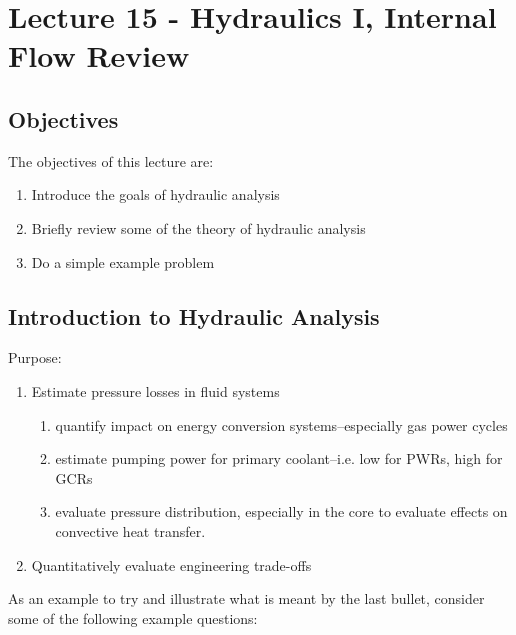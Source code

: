 \chapter{Lecture 15 - Hydraulics I, Internal Flow Review}
\label{ch:ch15}
\section{Objectives}
The objectives of this lecture are:
\begin{enumerate}
\item Introduce the goals of hydraulic analysis
\item Briefly review some of the theory of hydraulic analysis
\item Do a simple example problem
\end{enumerate}

\section{Introduction to Hydraulic Analysis}

Purpose:
\begin{enumerate}
\item Estimate pressure losses in fluid systems
\begin{enumerate}
\item quantify impact on energy conversion systems--especially gas power cycles
\item estimate pumping power for primary coolant--i.e. low for PWRs, high for GCRs
\item evaluate pressure distribution, especially in the core to evaluate effects on convective heat transfer.
\end{enumerate}
\item Quantitatively evaluate engineering trade-offs
\end{enumerate}

As an example to try and illustrate what is meant by the last bullet, consider some of the following example questions:

